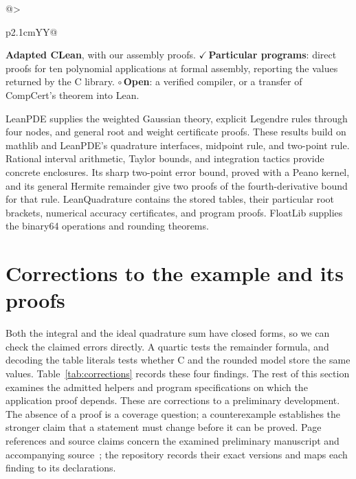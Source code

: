 \documentclass[11pt]{article}
\newcommand{\checked}[1]{\textcolor{provedcolor}{\ensuremath{\checkmark}\,\textbf{#1}}}
\newcommand{\openproof}{\textcolor{opencolor}{\ensuremath{\circ}\,\textbf{Open}}}
\begin{document}
\begin{table}[htbp]
\begin{tabularx}{\textwidth}{@{}>{\raggedright\arraybackslash}p{2.1cm}YY@{}}
\textbf{Adapted CLean}, with our assembly proofs.
\checked{Particular programs}: direct proofs for ten polynomial applications
at formal assembly, reporting the values returned by the C library.
\openproof{}: a verified compiler, or a transfer of CompCert's theorem into Lean.\\
\bottomrule
\end{tabularx}
\caption{Libraries and proof coverage at each level. The Rocq column describes
Appel and Bindel's preliminary development, including the admitted dependencies discussed in
Section~\ref{sec:discrepancies}. Our C proofs use a verified polynomial in
place of the external cosine. Their return values agree with the assembly
applications' result annotations by Theorem~\ref{thm:c-assembly-observations}.
That theorem concerns these programs' behavior, not the correctness of a
general compiler.}
\label{tab:comparison}
\end{table}

LeanPDE supplies the weighted Gaussian theory, explicit Legendre rules
through four nodes, and general root and weight certificate proofs.
These results build on mathlib and LeanPDE's quadrature interfaces,
midpoint rule, and two-point rule.
Rational interval arithmetic, Taylor bounds, and integration tactics provide concrete
enclosures. Its sharp two-point error bound, proved with a Peano kernel,
and its general Hermite remainder give two proofs of the fourth-derivative
bound for that rule.
LeanQuadrature contains the stored tables, their particular root brackets,
numerical accuracy certificates, and program proofs. FloatLib supplies
the binary64 operations and rounding theorems.

\section{Corrections to the example and its proofs}
\label{sec:discrepancies}

Both the integral and the ideal quadrature sum have closed forms, so we
can check the claimed errors directly. A quartic tests the remainder
formula, and decoding the table literals tests whether C and the rounded
model store the same values. Table~\ref{tab:corrections} records these four
findings. The rest of this section examines the admitted helpers and
program specifications on which the application proof depends.
These are corrections to a preliminary development. The absence of a proof
is a coverage question; a counterexample establishes the stronger claim
that a statement must change before it can be proved.
Page references and source claims concern the examined preliminary manuscript
and accompanying source~\cite{appelbindel,appelbindelcode}; the repository
records their exact versions and maps each finding to its declarations.
\end{document}
